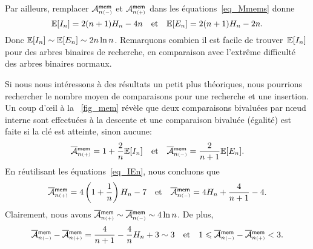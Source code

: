 Par ailleurs, remplacer \(\M{\fun{mem}}{n{\scriptscriptstyle
    (-)}}\) et \(\M{\fun{mem}}{n{\scriptscriptstyle (+)}}\) dans
les équations~\eqref{eq_Mmems} donne
\begin{equation}
\Expected{I_n} = 2(n+1)H_n - 4n
\quad\text{et}\quad
\Expected{E_n} = 2(n+1)H_n - 2n.
\label{eq_IEn}
\end{equation}
Donc \(\Expected{I_n} \sim \Expected{E_n} \sim 2n\ln n\). Remarquons
combien il est facile de trouver~\(\Expected{I_n}\) pour des arbres
binaires de recherche, en comparaison avec l'extrême difficulté des
arbres binaires normaux.

Si nous nous intéressons à des résultats un petit plus théoriques,
nous pourrions rechercher le nombre moyen de comparaisons pour une
recherche et une insertion. Un coup d'{\oe}il à la \fig~\vref{fig_mem}
révèle que deux comparaisons bivaluées par n{\oe}ud interne sont
effectuées à la descente et une comparaison bivaluée (égalité) est
faite si la clé est atteinte, sinon aucune:
\begin{equation}
\OM{\fun{mem}}{n{\scriptscriptstyle(+)}}
  = 1 + \frac{2}{n}\Expected{I_n}
\quad\text{et}\quad
\OM{\fun{mem}}{n{\scriptscriptstyle(-)}}
  = \frac{2}{n+1}\Expected{E_n}.
\label{eq_Mmem_cmp1}
\end{equation}
En réutilisant les équations~\eqref{eq_IEn}, nous concluons que
\begin{equation}
\OM{\fun{mem}}{n{\scriptscriptstyle(+)}}
  = 4\left(1+\frac{1}{n}\right)H_n - 7
\quad\text{et}\quad
\OM{\fun{mem}}{n{\scriptscriptstyle(-)}}
  = 4H_n + \frac{4}{n+1} - 4.
\index{mem@$\OM{\fun{mem}}{n{\scriptscriptstyle(-)}}$}
\index{mem@$\OM{\fun{mem}}{n{\scriptscriptstyle(+)}}$}
\label{eq_Mmem_cmp2}
\end{equation}
Clairement, nous avons \(\OM{\fun{mem}}{n{\scriptscriptstyle(+)}} \sim
\OM{\fun{mem}}{n{\scriptscriptstyle(-)}} \sim 4\ln n\). De plus,
\begin{equation*}
\OM{\fun{mem}}{n{\scriptscriptstyle (-)}} -
\OM{\fun{mem}}{n{\scriptscriptstyle (+)}} = 
\frac{4}{n+1} - \frac{4}{n}H_n + 3 \sim 3
\quad\text{et}\quad
1 \leqslant \OM{\fun{mem}}{n{\scriptscriptstyle (-)}} -
\OM{\fun{mem}}{n{\scriptscriptstyle (+)}} < 3.
\end{equation*}

